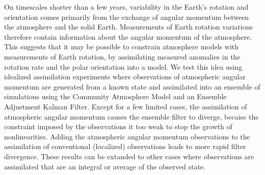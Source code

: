 On timescales shorter than a few years, variability in the Earth's rotation and orientation comes primarily from the exchange of angular momentum between the atmosphere and the solid Earth. 
Measurements of Earth rotation variations therefore contain information about the angular momentum of the atmosphere. 
This suggests that it may be possible to constrain atmosphere models with measurements of Earth rotation, by assimilating measured anomalies in the rotation rate and the polar orientation into a model. 
We test this idea using idealized assimilation experiments where observations of atmospheric angular momentum are generated from a known state and assimilated into an ensemble of simulations using the Community Atmosphere Model and an Ensemble Adjustment Kalman Filter. 
Except for a few limited cases, the assimilation of atmospheric angular momentum causes the ensemble filter to diverge, becaise the constraint imposed by the observations it too weak to stop the growth of nonlinearities. 
Adding the atmospheric angular momentum observations to the assimilation of conventional (localized) observations leads to more rapid filter divergence. 
These results can be extanded to other cases where observations are assimilated that are an integral or average of the observed state. 

